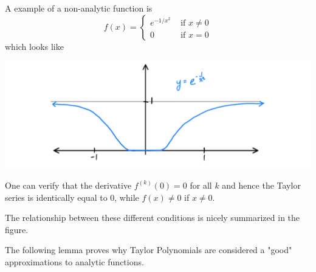     \begin{example}
      A example of a non-analytic function is
      \[f(x) = \begin{cases}
      e^{-1/x^2} & \text{ if } x \neq 0 \\
      0 & \text{ if } x = 0
      \end{cases}\]
      which looks like
      \begin{center}
          \includegraphics[scale=0.25]{img/Infinitely_Differentiable_Non_Analytic_Function.PNG}
      \end{center}
      One can verify that the derivative $f^{(k)} (0) = 0$ for all $k$ and hence the Taylor series is identically equal to $0$, while $f(x) \neq 0$ if $x \neq 0$. 
    \end{example}

    The relationship between these different conditions is nicely summarized in the figure. 
    \begin{center}
    \end{center}

    The following lemma proves why Taylor Polynomials are considered a "good" approximations to analytic functions. 

